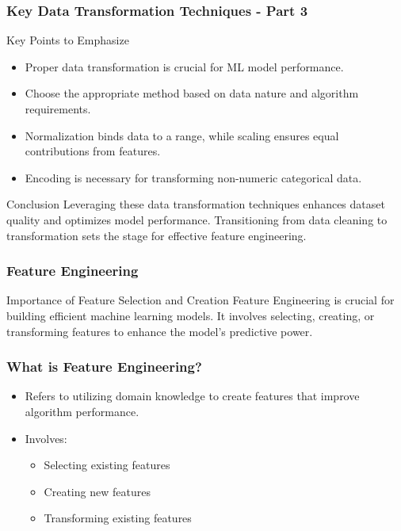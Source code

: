 \documentclass{beamer}
\begin{document}
\begin{frame}[fragile]
    \frametitle{Key Data Transformation Techniques - Part 3}
    \begin{block}{Key Points to Emphasize}
        \begin{itemize}
            \item Proper data transformation is crucial for ML model performance.
            \item Choose the appropriate method based on data nature and algorithm requirements.
            \item Normalization binds data to a range, while scaling ensures equal contributions from features.
            \item Encoding is necessary for transforming non-numeric categorical data.
        \end{itemize}
    \end{block}
    
    \begin{block}{Conclusion}
        Leveraging these data transformation techniques enhances dataset quality and optimizes model performance.
        Transitioning from data cleaning to transformation sets the stage for effective feature engineering.
    \end{block}
\end{frame}

\begin{frame}[fragile]
    \frametitle{Feature Engineering}
    \begin{block}{Importance of Feature Selection and Creation}
        Feature Engineering is crucial for building efficient machine learning models. It involves selecting, creating, or transforming features to enhance the model's predictive power.
    \end{block}
\end{frame}

\begin{frame}[fragile]
    \frametitle{What is Feature Engineering?}
    \begin{itemize}
        \item Refers to utilizing domain knowledge to create features that improve algorithm performance.
        \item Involves:
        \begin{itemize}
            \item Selecting existing features
            \item Creating new features
            \item Transforming existing features
        \end{itemize}
    \end{itemize}
\end{frame}
\end{document}
